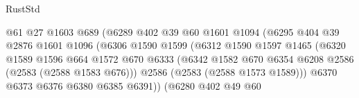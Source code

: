 \begin{lexlean}{RustStd}
\begin{coremodule}
{\begin{coremodule}
{{{{{{{{{{{{{{{                                        @61
                                        @27
                                        @1603
                                        @689
                                        (@6289
                                          @402
                                          @39
                                          @60
                                          @1601
                                          @1094
                                          (@6295
                                            @404
                                            @39
                                            @2876
                                            @1601
                                            @1096
                                            (@6306
                                              @1590
                                              @1599
                                              (@6312
                                                @1590
                                                @1597
                                                @1465
                                                (@6320
                                                  @1589
                                                  @1596
                                                  @664
                                                  @1572
                                                  @670
                                                  @6333
                                                  (@6342
                                                    @1582
                                                    @670
                                                    @6354
                                                    @6208
                                                    @2586
                                                    (@2583 (@2588 @1583 @676)))
                                                  @2586
                                                  (@2583 (@2588 @1573 @1589)))
                                                @6370
                                                @6373
                                                @6376
                                                @6380
                                                @6385
                                                @6391))
                                            (@6280
                                              @402
                                              @49
                                              @60
}}}}}}}}}}}}}}}
\end{coremodule}}
\end{coremodule}
\end{lexlean}
